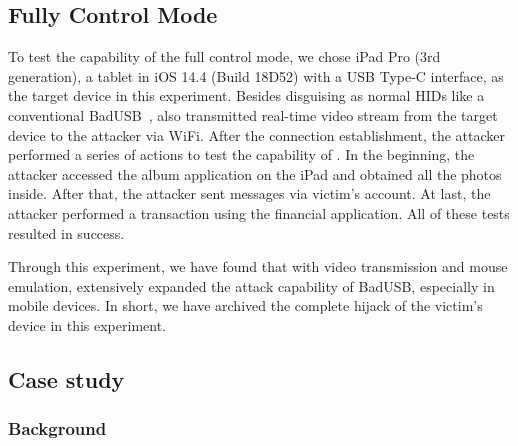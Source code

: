 \subsection{Fully Control Mode}

To test the capability of the full control mode, we chose iPad Pro (3rd
	generation), a tablet in iOS 14.4 (Build 18D52) with a \ac{USB} Type-C interface, as the target
device in this experiment.  Besides disguising as normal \acp{HID} like a
conventional BadUSB~\cite{badusb}, \tool also transmitted real-time video
stream from the target device to the attacker via WiFi.  After the connection
establishment, the attacker performed a series of actions to test the capability of
\tool. In the beginning, the attacker accessed the album application on the iPad and
obtained all the photos inside. After that, the attacker sent messages via victim's
account. At last, the attacker performed a transaction using the
financial application. All of these tests resulted in success.

Through this experiment, we have found that with video transmission and mouse
emulation, \tool extensively expanded the attack capability of BadUSB,
especially in mobile devices. In short, we have archived the complete hijack of the victim's
device in this experiment.

\subsection{Case study}
\label{subsec:case_study}

\subsubsection{Background}


